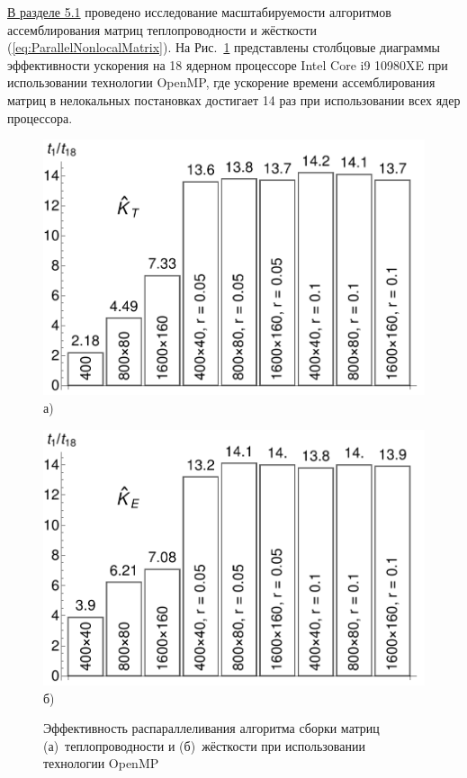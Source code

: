 \underline{В разделе 5.1} проведено исследование масштабируемости алгоритмов ассемблирования матриц теплопроводности и жёсткости (\ref{eq:ParallelNonlocalMatrix}). На Рис.~\ref{fig:OMPParallelization} представлены столбцовые диаграммы эффективности ускорения на 18 ядерном процессоре Intel Core i9
10980XE при использовании технологии OpenMP, где ускорение времени ассемблирования матриц в нелокальных постановках достигает 14 раз при использовании всех ядер процессора.

\begin{figure}[ht]
    \begin{minipage}[b][][b]{0.4\linewidth}\centering
        \includegraphics[width=\linewidth]{pics/OMPThermal.pdf} \\ а)
    \end{minipage}
    \hfill
    \begin{minipage}[b][][b]{0.4\linewidth}\centering
        \includegraphics[width=\linewidth]{pics/OMPMechanical.pdf} \\ б)
    \end{minipage}
    \caption{Эффективность распараллеливания алгоритма сборки матриц (а)~теплопроводности и (б)~жёсткости при использовании технологии OpenMP}
    \label{fig:OMPParallelization}
\end{figure}

